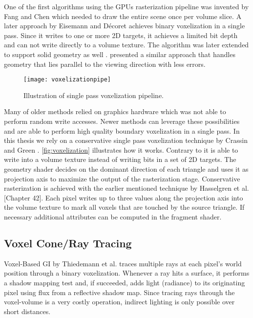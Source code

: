 \documentclass[thesis.tex]{subfiles}
\begin{document}

One of the first algorithms using the GPUs rasterization pipeline was invented by Fang and Chen \cite{bib:fangvoxelization} which needed to draw the entire scene once per volume slice.
A later approach by Eisemann and D{\'e}coret \cite{bib:eisemann:boundaryvox} achieves binary voxelization in a single pass.
Since it writes to one or more 2D targets, it achieves a limited bit depth and can not write directly to a volume texture.
The algorithm was later extended to support solid geometry as well \cite{bib:eisemann:solidvox}. 
\cite{bib:dong:voxelization} presented a similar approach that handles geometry that lies parallel to the viewing direction with less errors.

\begin{figure}[h]
\centering
\texttt{[image: voxelizationpipe]}
\caption{\cite{bib:openglinsightsvoxel} Illustration of single pass voxelization pipeline. }
\label{fig:voxelization}
\end{figure}
Many of older methods relied on graphics hardware which was not able to perform random write accesses.
Newer methods can leverage these possibilities and are able to perform high quality boundary voxelization in a single pass.
In this thesis we rely on a conservative single pass voxelization technique by Crassin and Green \cite{bib:openglinsightsvoxel}.
\autoref{fig:voxelization} illustrates how it works.
Contrary to \cite{bib:eisemann:boundaryvox} it is able to write into a volume texture instead of writing bits in a set of 2D targets.
The geometry shader decides on the dominant direction of each triangle and uses it as projection axis to maximize the output of the rasterization stage.
Conservative rasterization is achieved with the earlier mentioned technique by Hasselgren et al. \cite{bib:GPUGems2}[Chapter 42]. 
Each pixel writes up to three values along the projection axis into the volume texture to mark all voxels that are touched by the source triangle.
If necessary additional attributes can be computed in the fragment shader.

\subsection{Voxel Cone/Ray Tracing} \label{sec:prev:voxelcone}
Voxel-Based GI by Thiedemann et al. \cite{bib:voxelgi} traces multiple rays at each pixel's world position through a binary voxelization.
Whenever a ray hits a surface, it performs a shadow mapping test and, if succeeded, adds light (radiance) to its originating pixel using flux from a reflective shadow map.
Since tracing rays through the voxel-volume is a very costly operation, indirect lighting is only possible over short distances.
\end{document}
